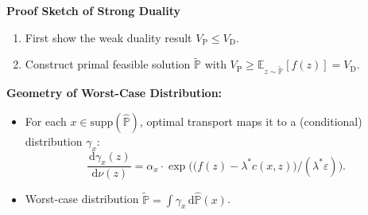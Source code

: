 \documentclass[landscape,a0b,final,a4resizeable]{include/a0poster}
\newcommand{\bP}{\mathbb{P}}
\newcommand{\Reg}{\varepsilon}
\newcommand{\diff}{\,\mathrm{d}}
\newcommand{\hP}{\widehat{\mathbb{P}}}
\begin{document}
\begin{poster}
\begin{multicols}{4}
{
\LARGE
{\bf Proof Sketch of Strong Duality}
\begin{enumerate}
\item
First show the {\color{blue}weak duality} result $V_{\text{P}}\le V_{\text{D}}$.
\item
Construct {\color{blue}primal feasible solution $\widetilde{\bP}$} with $V_{\text{P}}\ge\mathbb{E}_{z\sim \widetilde{\bP}}[f(z)]=V_{\text{D}}$.
\end{enumerate}
{\color{purple}
{\bf Geometry of Worst-Case Distribution: }}
\begin{itemize}
\item
For each $x\in\text{supp}(\widehat{\mathbb{P}})$, optimal transport maps it to a (conditional) distribution $\gamma_x$:
\[
\frac{\diff\gamma_x(z)}{\diff\nu(z)}=
  \alpha_x\cdot\exp\Big(\big( 
  f(z) - \lambda^\ast c(x,z) \big)/(\lambda^\ast\Reg)\Big).
\]
\item
Worst-case distribution $\widetilde{\bP} = \int \gamma_x \diff\hP(x)$. 
\end{itemize}
}




\end{multicols}
\end{poster}
\end{document}
